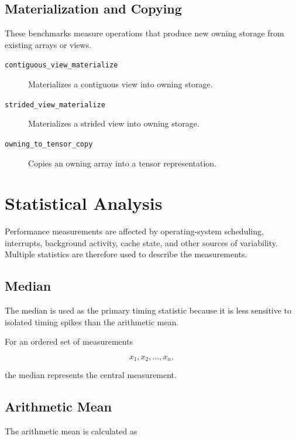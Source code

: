 \documentclass[11pt]{article}
\begin{document}
\subsection{Materialization and Copying}

These benchmarks measure operations that produce new owning
storage from existing arrays or views.

\begin{description}

    \item[\texttt{contiguous\_view\_materialize}]
    Materializes a contiguous view into owning storage.

    \item[\texttt{strided\_view\_materialize}]
    Materializes a strided view into owning storage.

    \item[\texttt{owning\_to\_tensor\_copy}]
    Copies an owning array into a tensor representation.

\end{description}


\section{Statistical Analysis}

Performance measurements are affected by operating-system
scheduling, interrupts, background activity, cache state, and
other sources of variability. Multiple statistics are therefore
used to describe the measurements.


\subsection{Median}

The median is used as the primary timing statistic because it is
less sensitive to isolated timing spikes than the arithmetic mean.

For an ordered set of measurements

\[
x_1, x_2, \ldots, x_n,
\]

the median represents the central measurement.


\subsection{Arithmetic Mean}

The arithmetic mean is calculated as
\end{document}

